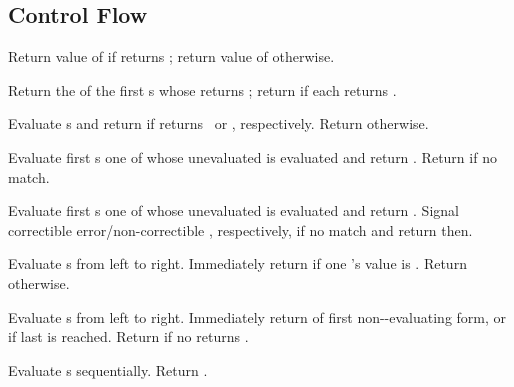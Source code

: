 \subsection{Control Flow}
\begin{LIST}{1cm}

  {Return value of
   if  returns \T; return value of
   otherwise.
  }

  {
  Return the  of the first
  s whose  returns \T; return
  \retval{\NIL} if each  returns \NIL.
  }

  {
  Evaluate s and return  if
   returns \T\ or \NIL, respectively. Return \retval{\NIL} otherwise.
  }

  {
  Evaluate first s one of whose unevaluated  is
   evaluated  and return .
  Return  if no  match. 
  }

  {
  Evaluate first s one of whose unevaluated  is  evaluated
   and return . Signal correctible error/non-correctible ,
  respectively, if no  match and return \retval{\NIL} then.
  }

  {
  Evaluate s from left to
  right. Immediately return \retval{\NIL} if one 's value is \NIL. Return
   otherwise.
  }

  {
  Evaluate s from left to
  right. Immediately return  of first
  non-\NIL-evaluating form, or  if last 
  is reached. Return \retval{\NIL} if no  returns \T.
  }

  {Evaluate s sequentially. Return
  .
  }


\end{LIST}
